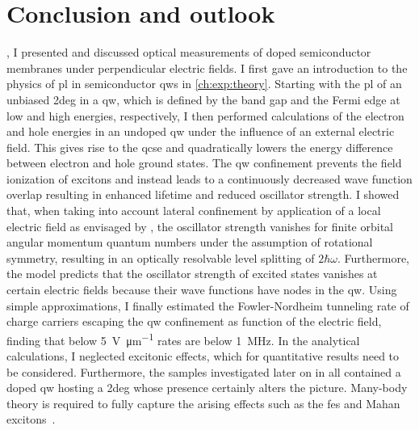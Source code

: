 \chapter{Conclusion and outlook}\label{ch:exp:conclusion}
 \thispart, I presented and discussed optical measurements of doped semiconductor membranes under perpendicular electric fields.
I first gave an introduction to the physics of \acrfull{pl} in semiconductor \glspl{qw} in \cref{ch:exp:theory}.
Starting with the \gls{pl} of an unbiased \gls{2deg} in a \gls{qw}, which is defined by the band gap and the Fermi edge at low and high energies, respectively, I then performed calculations of the electron and hole energies in an undoped \gls{qw} under the influence of an external electric field.
This gives rise to the \gls{qcse} and quadratically lowers the energy difference between electron and hole ground states.
The \gls{qw} confinement prevents the field ionization of excitons and instead leads to a continuously decreased wave function overlap resulting in enhanced lifetime and reduced oscillator strength.
I showed that, when taking into account lateral confinement by application of a local electric field as envisaged by \textcite{Descamps2021}, the oscillator strength vanishes for finite orbital angular momentum quantum numbers under the assumption of rotational symmetry, resulting in an optically resolvable level splitting of $2\hbar\omega$.
Furthermore, the model predicts that the oscillator strength of excited states vanishes at certain electric fields because their wave functions have nodes in the \gls{qw}.
Using simple approximations, I finally estimated the Fowler-Nordheim tunneling rate of charge carriers escaping the \gls{qw} confinement as function of the electric field, finding that below \qty{5}{\volt\per\micro\meter} rates are below \qty{1}{\mega\hertz}.
In the analytical calculations, I neglected excitonic effects, which for quantitative results need to be considered.
Furthermore, the samples investigated later on in \thispart all contained a doped \gls{qw} hosting a \gls{2deg} whose presence certainly alters the picture.
Many-body theory is required to fully capture the arising effects such as the \gls{fes} and Mahan excitons~\cite{Mahan1967a}.

